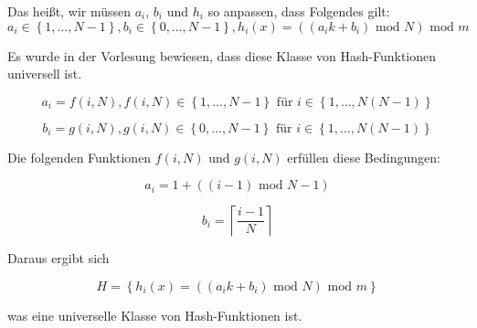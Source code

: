 \documentclass{article}
\begin{document}
Das hei{\ss}t, wir m{\"u}ssen $a_i$, $b_i$ und $h_i$ so anpassen, dass Folgendes
gilt:
\begin{equation}
  a_i \in \left\{ 1, \ldots, N - 1 \right\},
  b_i \in \left\{ 0, \ldots, N - 1 \right\},
  h_i \left( x \right) = \left( \left( a_ik + b_i \right)\text{ mod } N \right)\text{ mod } m
\end{equation}

Es wurde in der Vorlesung bewiesen, dass diese Klasse von Hash-Funktionen
universell ist.

\clearpage

\begin{equation}
  a_i = f \left( i, N \right),
  f \left( i, N \right) \in \left\{ 1, \ldots, N - 1 \right\}\text{ f{\"u}r }
  i \in \left\{ 1, \ldots, N \left( N - 1 \right) \right\}
\end{equation}

\begin{equation}
  b_i = g \left( i, N \right),
  g \left( i, N \right) \in \left\{ 0, \ldots, N - 1 \right\}\text{ f{\"u}r }
  i \in \left\{ 1, \ldots, N \left( N - 1 \right) \right\}
\end{equation}

Die folgenden Funktionen $f \left( i, N \right)$ und $g \left( i, N \right)$
erf{\"u}llen diese Bedingungen:

\begin{equation}
  a_i = 1 + \left( \left( i - 1 \right)\text{ mod } N - 1 \right)
\end{equation}

\begin{equation}
  b_i = \left\lceil \frac{i - 1}{N} \right\rceil
\end{equation}

Daraus ergibt sich

\begin{equation}
  H = \left\{ h_i \left( x \right) = \left( \left( a_ik + b_i \right)\text{ mod } N \right)\text{ mod } m \right\}
\end{equation}

was eine universelle Klasse von Hash-Funktionen ist.
\end{document}
